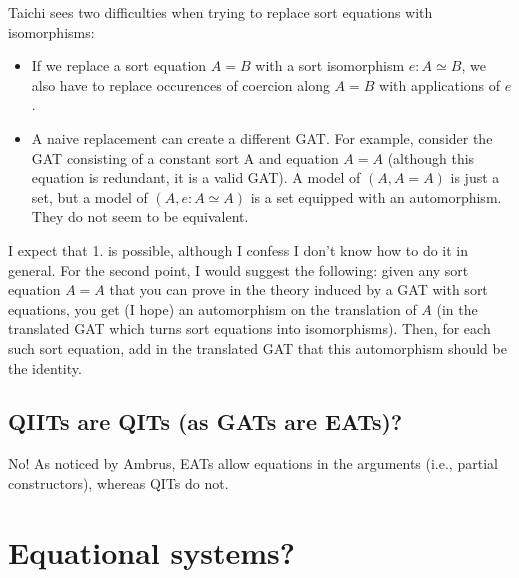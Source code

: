 \documentclass{article}
\begin{document}
Taichi sees two difficulties when trying to replace sort
equations with isomorphisms:
\begin{itemize}
\item If we replace a sort equation $A = B$ with a sort isomorphism $e : A \simeq B$, we also have to replace occurences of coercion along $A = B$ with
  applications of $e$.
  \item A naive replacement can create a different GAT. For
  example, consider the GAT consisting of a constant sort A and equation $A = A$
  (although this equation is redundant, it is a valid GAT). A model of
  $(A, A = A)$ is just a set, but a model of $(A, e : A \simeq A)$ is a set equipped with an
  automorphism. They do not seem to be equivalent.
\end{itemize}
I expect that 1. is possible, although I confess I don't know how to
do it in general.
For the second point, I would suggest the
following: given any sort equation $A = A$ that you can prove in the
theory induced by a GAT with sort equations, you get (I hope) an
automorphism on the translation of $A$ (in the translated GAT which
turns sort equations into isomorphisms). Then,  for each such sort
equation, add in the translated GAT that this automorphism should be
the identity.
\subsection{QIITs are QITs (as GATs are EATs)?}

No! As noticed by Ambrus, EATs allow equations in the arguments (i.e., partial
constructors), whereas QITs do not.
\section{Equational systems?}
\appendix
\end{document}

